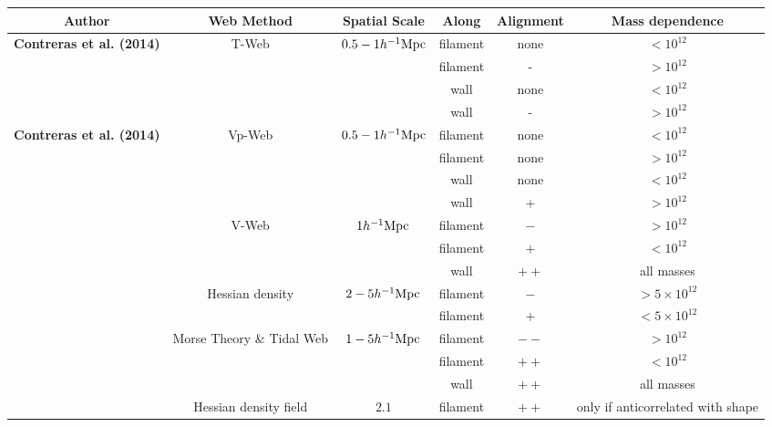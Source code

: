 \documentclass[usenatbib]{mn2e}
\newcommand{\hMpc}{{\ifmmode{h^{-1}{\rm Mpc}}\else{$h^{-1}$Mpc }\fi}}
\newcommand{\hMsun}{{\ifmmode{h^{-1}{\rm
        {M_{\odot}}}}\else{$h^{-1}{\rm{M_{\odot}}}$}\fi}}
\begin{document}
\begin{table}
\begin{tabular}{cccccc}\hline\hline
Author & Web Method & Spatial Scale & Along &
Alignment & Mass dependence\\\hline

{\bf Contreras et al. (2014)} & T-Web & $0.5-1 \hMpc$ & 
filament &none & $<10^{12}$\hMsun\\

&   & & 
filament & - & $>10^{12}$\hMsun\\

&   & & 
wall & none & $<10^{12}$\hMsun\\

&   & & 
wall & - & $>10^{12}$\hMsun\\\hline

{\bf Contreras et al. (2014)} & Vp-Web & $0.5-1 \hMpc$ & 
filament &none & $<10^{12}$\hMsun\\

&   & & 
filament & none & $>10^{12}$\hMsun\\

&   & & 
wall & none & $<10^{12}$\hMsun\\

&   & & 
wall & + & $>10^{12}$\hMsun\\\hline

\cite{Libeskind2013} & V-Web & $1 \hMpc$ & 
filament &$-$ & $>10^{12}$\hMsun\\

&   & & 
filament &$+$ & $<10^{12}$\hMsun\\

&   & & 
wall & $++$ & all masses\\\hline

\cite{Trowland2013} & Hessian density & $2-5\hMpc$ & 
filament & $-$ & $> 5\times 10^{12}$\hMsun\\
&   & & 
filament & $+$ & $< 5\times 10^{12}$\hMsun\\\hline

\cite{Codis2012} & Morse Theory \& Tidal Web & $1-5\hMpc$ & 
filament & $--$ & $>10^{12}$\hMsun \\ 

&   & & 
filament & $++$ & $<10^{12}$\hMsun \\ 

& & & 
wall & $++$ & all masses\\\hline

\cite{Zhang2009}  & Hessian density field &  $2.1$\hMpc & 
filament & $++$ & only if anticorrelated with shape\\


\end{tabular}
\end{table}
\end{document}
